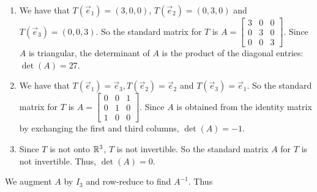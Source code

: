 \documentclass[12pt,letterpaper]{article}
\begin{document}
\begin{enumerate}
\begin{enumerate}
  \end{enumerate}
  
  \Answer 
  
  \begin{enumerate}
  
  \item 		We have that $T(\vec e_{1})=(3,0,0)$, $T(\vec e_{2})=(0,3,0)$ and $T(\vec e_{3})=(0,0,3)$.
			So the standard matrix for $T$ is $A=\begin{bmatrix}3&0&0\\0&3&0\\0&0&3\end{bmatrix}$.
			Since $A$ is triangular, the determinant of $A$ is the product of the diagonal entries: $\det(A)=27$.

  
  \item 		We have that $T(\vec e_{1})=\vec e_3, T(\vec e_{2})=\vec e_{2}$ and $T(\vec e_{3})=\vec e_{1}$.
			So the standard matrix for $T$ is
			$A=\begin{bmatrix}0&0&1\\0&1&0\\1&0&0\end{bmatrix}.$ Since $A$ is obtained from the identity
			matrix by exchanging the first and third columns, $\det(A)=-1$.
  
  \item  Since $T$ is not onto $\mathbb{R}^{3}$, $T$ is not invertible. So the standard matrix $A$ for $T$ is not
			invertible. Thus, $\det(A)=0$.
  
  \end{enumerate}
  
  
  \Answer We augment $A$ by $I_3$ and row-reduce to find $A^{-1}$. Thus


\end{enumerate}
\end{document}
